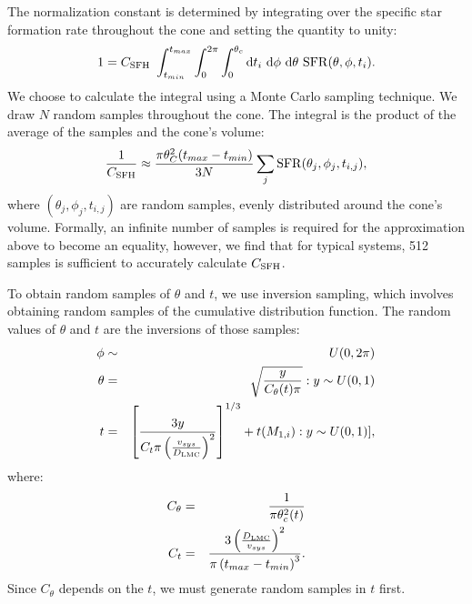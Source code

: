 \documentclass[12pt, preprint]{aastex}
\newcommand{\dd}{\mathrm{d}}
\begin{document}
The normalization constant is determined by integrating over the specific star formation rate throughout the cone and setting the quantity to unity:
\begin{equation}
1 = C_{\rm SFH}\ \int_{t_{min}}^{t_{max}} \int_0^{2 \pi} \int_0^{\theta_c} \dd t_i\ \dd \phi\ \dd \theta\ {\rm SFR}(\theta, \phi, t_i). 
\end{equation}
We choose to calculate the integral using a Monte Carlo sampling technique. We draw $N$ random samples throughout the cone. The integral is the product of the average of the samples and the cone's volume:
\begin{equation}
\frac{1}{C_{\rm SFH}} \approx \frac{\pi \theta_C^2 (t_{max} - t_{min})}{3N} \sum_j {\rm SFR}(\theta_j, \phi_j, t_{i,j}),
\end{equation}
where $(\theta_j, \phi_j, t_{i,j})$ are random samples, evenly distributed around the cone's volume. Formally, an infinite number of samples is required for the approximation above to become an equality, however, we find that for typical systems, 512 samples is sufficient to accurately calculate $C_{\rm SFH}$.



 To obtain random samples of $\theta$ and $t$, we use inversion sampling, which involves obtaining random samples of the cumulative distribution function. The random values of $\theta$ and $t$ are the inversions of those samples:
 \begin{eqnarray}
\phi &\sim& U(0, 2\pi) \\
\theta &=& \sqrt{\frac{y}{C_{\theta}(t) \pi}}: y \sim U(0,1) \\
t &=& \left[ \frac{3y}{C_t \pi \left( \frac{v_{sys}}{D_{\rm LMC}} \right)^2} \right]^{1/3} + t(M_{1,i}): y \sim U(0,1)], 
\end{eqnarray}
where:
\begin{eqnarray}
C_{\theta} &=& \frac{1}{\pi \theta_c^2(t)} \\
C_t &=& \frac{ 3 \left( \frac{D_{\rm LMC}}{v_{sys}} \right)^2 }{ \pi \left( t_{max} - t_{min} \right)^3 }.
\end{eqnarray}
Since $C_{\theta}$ depends on the $t$, we must generate random samples in $t$ first. 
\end{document}
